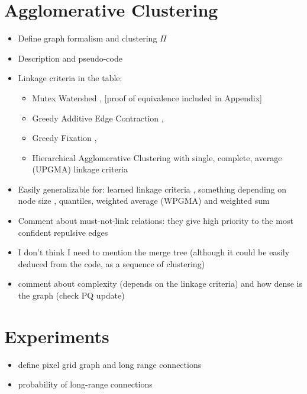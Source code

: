 \documentclass[10pt,twocolumn,letterpaper]{article}
\begin{document}
\begin{algorithm}
\begin{algorithmic}[1]

  \end{algorithmic}
\end{algorithm}






\section{Agglomerative Clustering}
\begin{itemize}
\item Define graph formalism and clustering $\Pi$
\item Description and pseudo-code
\item Linkage criteria in the table:
\begin{itemize}
\item Mutex Watershed \cite{wolf2018mutex}, [proof of equivalence included in Appendix]
\item Greedy Additive Edge Contraction \cite{levinkov2017comparative}, 
\item Greedy Fixation \cite{levinkov2017comparative}, 
\item Hierarchical Agglomerative Clustering with single, complete, average (UPGMA) linkage criteria
\end{itemize}
\item Easily generalizable for: learned linkage criteria \cite{nunez2013machine}, something depending on node size \cite{felzenszwalb2004efficient}, quantiles, weighted average (WPGMA) and weighted sum

\item Comment about must-not-link relations: they give high priority to the most confident repulsive edges 
\item I don't think I need to mention the merge tree (although it could be easily deduced from the code, as a sequence of clustering)
\item comment about complexity (depends on the linkage criteria) and how dense is the graph (check PQ update)
\end{itemize}


\section{Experiments}
\begin{itemize}
\item define pixel grid graph and long range connections
\item probability of long-range connections
\end{itemize}
\end{document}
